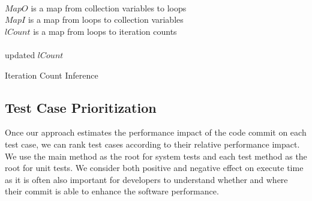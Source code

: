\setlength{\textfloatsep}{6pt}
\begin{algorithm}[t]
	\begin{algorithmic}[1]		
		\REQUIRE~~\\
		$MapO$ is a map from collection variables to loops\\
		$MapI$ is a map from loops to collection variables\\
		$lCount$ is a map from loops to iteration counts\\
		\ENSURE~~\\ updated $lCount$\\
		\ENDIF
		\ENDFOR
		\ENDWHILE
	\end{algorithmic}
	\caption{Iteration Count Inference}
	\label{alg:infer}
\end{algorithm}

\vspace{-0.2cm}
\subsection{Test Case Prioritization}
\vspace{-0.1cm}
Once our approach estimates the performance impact of the code commit on each test case, we can rank test cases according to their relative performance impact. We use the main method as the root for system tests and each test method as the root for unit tests. We consider both positive and negative effect on execute time as it is often also important for developers to understand whether and where their commit is able to enhance the software performance. 



